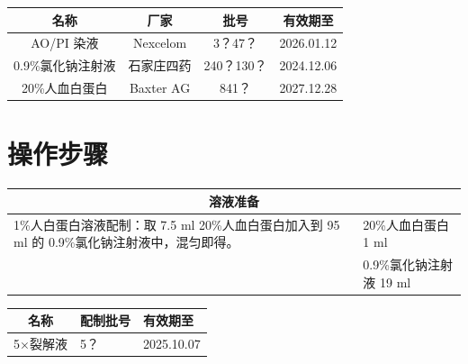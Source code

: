\documentclass[UTF8,10pt,a4paper,fontset=fandol]{ctexart}
\newcommand{\fieldvalue}[1]{#1}
\newcommand{\handwritten}[1]{#1}
\begin{document}
\begin{tabularx}{\textwidth}{|c|c|c|c|}
\hline
名称 & 厂家 & 批号 & 有效期至\\
\hline
AO/PI 染液 &
\fieldvalue{Nexcelom} &
\fieldvalue{\handwritten{3？47？}} &
\fieldvalue{\handwritten{2026.01.12}}\\
\hline
0.9\%氯化钠注射液 &
\fieldvalue{石家庄四药} &
\fieldvalue{\handwritten{240？130？}} &
\fieldvalue{\handwritten{2024.12.06}}\\
\hline
20\%人血白蛋白 &
\fieldvalue{Baxter AG} &
\fieldvalue{\handwritten{841？}} &
\fieldvalue{\handwritten{2027.12.28}}\\
\hline
\end{tabularx}

\section{操作步骤}

\begin{tabularx}{\textwidth}{|X|X|}
\hline
\multicolumn{2}{|c|}{溶液准备}\\
\hline
1\%人白蛋白溶液配制：取 7.5 ml 20\%人血白蛋白加入到 95 ml 的 0.9\%氯化钠注射液中，混匀即得。 &
20\%人血白蛋白
\fieldvalue{\handwritten{1}} ml\\
&
0.9\%氯化钠注射液
\fieldvalue{\handwritten{19}} ml\\
\hline
\end{tabularx}

\begin{tabularx}{\textwidth}{|c|X|X|}
\hline
名称 & 配制批号 & 有效期至\\
\hline
5$\times$裂解液 &
\fieldvalue{\handwritten{5？}} &
\fieldvalue{\handwritten{2025.10.07}}\\
\hline
\end{tabularx}
\end{document}

